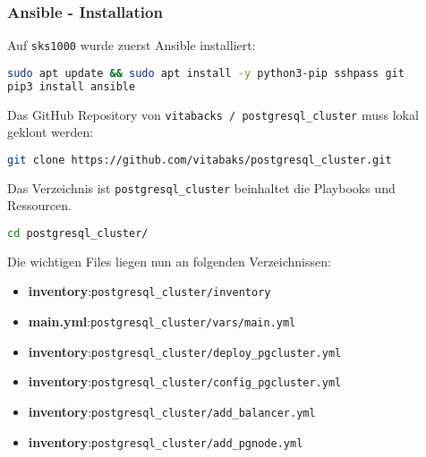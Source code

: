 
\begin{flushleft}
    \subsubsection{Ansible - Installation}
    Auf \texttt{sks1000} wurde zuerst \Gls{Ansible} installiert:
    \lstset{style=gra_codestyle}
    \begin{lstlisting}[language=bash, caption=Ansible - Installation,captionpos=b,label={lst:ansible-installation},breaklines=true]
sudo apt update && sudo apt install -y python3-pip sshpass git
pip3 install ansible
    \end{lstlisting}
    Das \Gls{GitHub} Repository von \texttt{vitabacks / postgresql\_cluster} muss lokal geklont werden:
    \lstset{style=gra_codestyle}
    \begin{lstlisting}[language=bash, caption=Ansible - Repository Clone,captionpos=b,label={lst:ansible-repository-clone},breaklines=true]
git clone https://github.com/vitabaks/postgresql_cluster.git
    \end{lstlisting}
    Das Verzeichnis ist \texttt{postgresql\_cluster} beinhaltet die Playbooks und Ressourcen.
    \lstset{style=gra_codestyle}
    \begin{lstlisting}[language=bash, caption=Ansible - cd Repository,captionpos=b,label={lst:ansible-cd-repository},breaklines=true]
cd postgresql_cluster/
    \end{lstlisting}
    Die wichtigen Files liegen nun an folgenden Verzeichnissen:
    \begin{itemize}
        \item \textbf{inventory}:\hfill \texttt{postgresql\_cluster/inventory}
        \item \textbf{main.yml}:\hfill \texttt{postgresql\_cluster/vars/main.yml}
        \item \textbf{inventory}:\hfill \texttt{postgresql\_cluster/deploy\_pgcluster.yml}
        \item \textbf{inventory}:\hfill \texttt{postgresql\_cluster/config\_pgcluster.yml}
        \item \textbf{inventory}:\hfill \texttt{postgresql\_cluster/add\_balancer.yml}
        \item \textbf{inventory}:\hfill \texttt{postgresql\_cluster/add\_pgnode.yml}
    \end{itemize}
\end{flushleft}